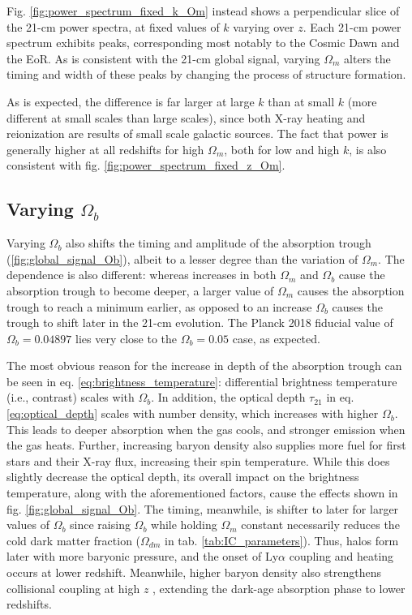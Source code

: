 \documentclass[floats,floatfix,showpacs,amssymb,prd,superscriptaddress,nofootinbib]{revtex4-2} %
\begin{document}
Fig. \ref{fig:power_spectrum_fixed_k_Om} instead shows a perpendicular slice of the 21-cm power spectra, at fixed values of $k$ varying over $z$. Each 21-cm power spectrum exhibits peaks, corresponding most notably to the Cosmic Dawn and the EoR. As is consistent with the 21-cm global signal, varying $\Omega_m$ alters the timing and width of these peaks by changing the process of structure formation.


As is expected, the difference is far larger at large $k$ than at small $k$ (more different at small scales than large scales), since both X-ray heating and reionization are results of small scale galactic sources. The fact that power is generally higher at all redshifts for high $\Omega_m$, both for low and high $k$, is also consistent with fig. \ref{fig:power_spectrum_fixed_z_Om}.


\subsection{Varying $\Omega_b$}

Varying $\Omega_b$ also shifts the timing and amplitude of the absorption trough (\ref{fig:global_signal_Ob}), albeit to a lesser degree than the variation of $\Omega_m$. The dependence is also different: whereas increases in both $\Omega_m$ and $\Omega_b$ cause the absorption trough to become deeper, a larger value of $\Omega_m$ causes the absorption trough to reach a minimum earlier, as opposed to an increase $\Omega_b$ causes the trough to shift later in the 21-cm evolution. The Planck 2018 fiducial value of $\Omega_b = 0.04897$ lies very close to the $\Omega_b = 0.05$ case, as expected.

The most obvious reason for the increase in depth of the absorption trough can be seen in eq. \ref{eq:brightness_temperature}: differential brightness temperature (i.e., contrast) scales with $\Omega_b$. In addition, the optical depth $\tau_{21}$ in eq. \ref{eq:optical_depth} scales with number density, which increases with higher $\Omega_b$. This leads to deeper absorption when the gas cools, and stronger emission when the gas heats. Further, increasing baryon density also supplies more fuel for first stars and their X-ray flux, increasing their spin temperature. While this does slightly decrease the optical depth, its overall impact on the brightness temperature, along with the aforementioned factors, cause the effects shown in fig. \ref{fig:global_signal_Ob}. The timing, meanwhile, is shifter to later for larger values of $\Omega_b$ since raising $\Omega_b$ while holding $\Omega_m$ constant necessarily reduces the cold dark matter fraction ($\Omega_{dm}$ in tab. \ref{tab:IC_parameters}). Thus, halos form later with more baryonic pressure, and the onset of Ly$\alpha$ coupling and heating occurs at lower redshift. Meanwhile, higher baryon density also strengthens collisional coupling at high $z$ , extending the dark-age absorption phase to lower redshifts. 
\end{document}
